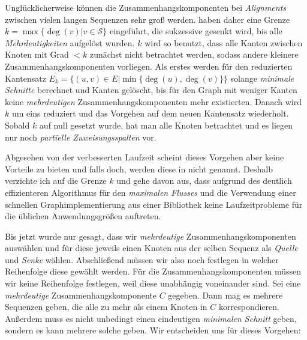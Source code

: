 Unglücklicherweise können die Zusammenhangskomponenten bei \emph{Alignments} zwischen vielen langen Sequenzen sehr groß werden. \cite{cpm10} haben daher eine Grenze $k = \max\{\deg(v)| v \in \mathcal{S}\}$ eingeführt, die sukzessive gesenkt wird, bis alle \emph{Mehrdeutigkeiten} aufgelöst wurden. $k$ wird so benutzt, dass alle Kanten zwischen Knoten mit Grad $< k$ zunächst nicht betrachtet werden, sodass andere kleinere Zusammenhangskomponenten vorliegen. Als erstes werden für den reduzierten Kantensatz $E_k = \{(u,v) \in E|\min\{\deg(u),\deg(v)\}\}$ solange \emph{minimale Schnitte} berechnet und Kanten gelöscht, bis für den Graph mit weniger Kanten keine \emph{mehrdeutigen} Zusammenhangskomponenten mehr existierten. Danach wird $k$ um eins reduziert und das Vorgehen auf dem neuen Kantensatz wiederholt. Sobald $k$ auf null gesetzt wurde, hat man alle Knoten betrachtet und es liegen nur noch \emph{partielle Zuweisungsspalten} vor. 

Abgesehen von der verbesserten Laufzeit scheint dieses Vorgehen aber keine Vorteile zu bieten und falls doch, werden diese in \cite{cpm10} nicht genannt. Deshalb verzichte ich auf die Grenze $k$ und gehe davon aus, dass aufgrund des deutlich effizienteren Algorithmus für den \emph{maximalen Flusses} und die Verwendung einer schnellen Graphimplementierung aus einer Bibliothek keine Laufzeitprobleme für die üblichen Anwendungsgrößen auftreten. 

Bis jetzt wurde nur gesagt, dass wir \emph{mehrdeutige} Zusammenhangskomponenten auswählen und für diese jeweils einen Knoten aus der selben Sequenz als \emph{Quelle} und \emph{Senke} wählen. Abschließend müssen wir also noch festlegen in welcher Reihenfolge diese gewählt werden. Für die Zusammenhangskomponenten müssen wir keine Reihenfolge festlegen, weil diese unabhängig voneinander sind. Sei eine \emph{mehrdeutige} Zusammenhangskomponente $C$ gegeben. Dann mag es mehrere Sequenzen geben, die alle zu mehr als einem Knoten in $C$ korrespondieren. Außerdem muss es nicht unbedingt einen eindeutigen \emph{minimalen Schnitt} geben, sondern es kann mehrere solche geben. Wir entscheiden uns für dieses Vorgehen:

